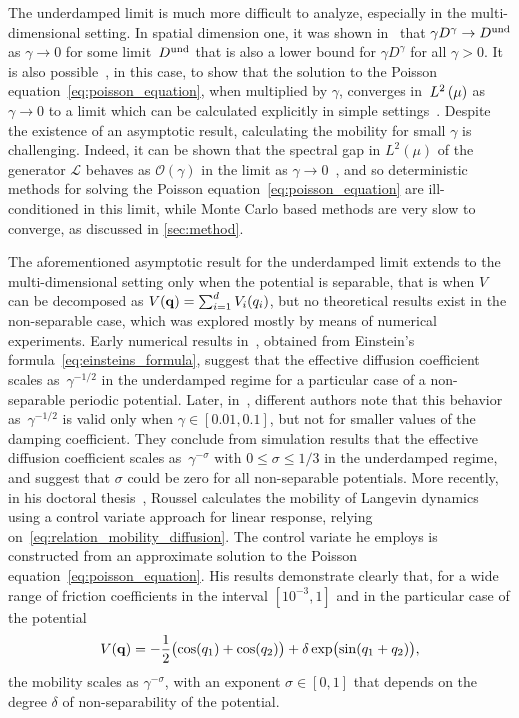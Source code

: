 \documentclass[11pt,a4paper]{article}
\begin{document}
The underdamped limit is much more difficult to analyze,
especially in the multi-dimensional setting.
In spatial dimension one, it was shown in~\cite{MR2394704} that $\gamma D^{\gamma} \to D^{\rm und}$ as $\gamma \to 0$ for some limit~$D^{\rm und}$
that is also a lower bound for $\gamma D^{\gamma}$ for all $\gamma > 0$.
It is also possible~\cite[Lemma~3.4]{MR2394704}, in this case,
to show that the solution to the Poisson equation~\eqref{eq:poisson_equation},
when multiplied by $\gamma$, converges in~$\lp{2}{\mu}$ as $\gamma \to 0$ to a limit
which can be calculated explicitly in simple settings~\cite{MR2427108}.
Despite the existence of an asymptotic result,
calculating the mobility for small $\gamma$ is challenging.
Indeed, it can be shown that the spectral gap in $L^2(\mu)$ of the generator $\mathcal L$ behaves as $\mathcal O(\gamma)$ in the limit as $\gamma \to 0$~\cite{MR2394704,MR3106879,MR3522857,roussel2018spectral},
and so deterministic methods for solving the Poisson equation~\eqref{eq:poisson_equation} are ill-conditioned in this limit,
while Monte Carlo based methods are very slow to converge,
as discussed in \cref{sec:method}.

The aforementioned asymptotic result for the underdamped limit extends to the multi-dimensional setting only when the potential is separable,
that is when $V$ can be decomposed as $V(\boldsymbol{\mathbf q}) = \sum_{i=1}^d V_i(q_i)$,
but no theoretical results exist in the non-separable case,
which was explored mostly by means of numerical experiments.
Early numerical results in~\cite{chen1996surface}, obtained from Einstein's formula~\eqref{eq:einsteins_formula},
suggest that the effective diffusion coefficient scales as~$\gamma^{-1/2}$ in the underdamped regime for a particular case of a non-separable periodic potential.
Later, in~\cite{Braun02},
different authors note that this behavior as~$\gamma^{-1/2}$ is valid only when $\gamma \in [0.01, 0.1]$,
but not for smaller values of the damping coefficient.
They conclude from simulation results that the effective diffusion coefficient scales as~$\gamma^{-\sigma}$ with $0 \leq \sigma \leq 1/3$ in the underdamped regime,
and suggest that $\sigma$ could be zero for all non-separable potentials.
More recently, in his doctoral thesis~\cite{roussel_thesis},
Roussel calculates the mobility of Langevin dynamics using a control variate approach for linear response,
relying on~\eqref{eq:relation_mobility_diffusion}.
The control variate he employs is constructed from an approximate solution to the Poisson equation~\eqref{eq:poisson_equation}.
His results demonstrate clearly that, for a wide range of friction coefficients in the interval $[10^{-3}, 1]$
and in the particular case of the potential
\begin{equation}
    \label{eq:potential_julien}
    V(\boldsymbol{\mathbf q}) = - \frac{1}{2} \bigl( \cos(q_1) + \cos(q_2) \bigr) + \delta \exp \bigl(\sin(q_1 + q_2)\bigr),
\end{equation}
the mobility scales as $\gamma^{- \sigma}$,
with an exponent $\sigma \in [0, 1]$ that depends on the degree $\delta$ of non-separability of the potential.
\end{document}
